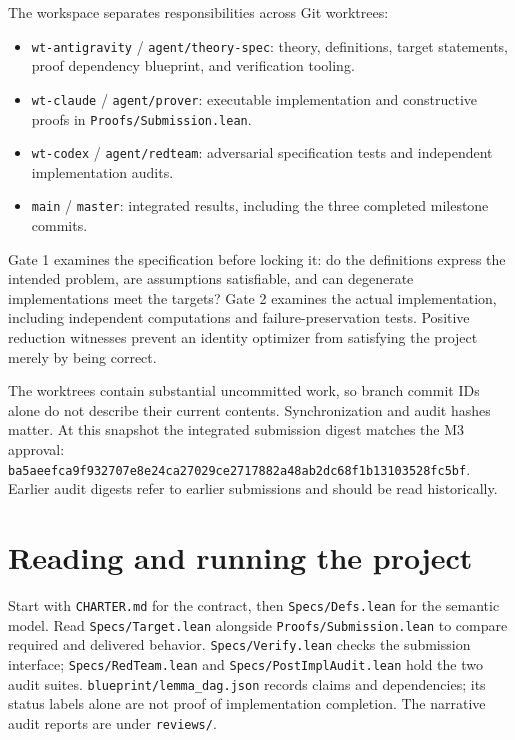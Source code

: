 \documentclass[11pt]{article}
\begin{document}
The workspace separates responsibilities across Git worktrees:

\begin{itemize}
\item \texttt{wt-antigravity} / \texttt{agent/theory-spec}: theory, definitions, target statements, proof dependency blueprint, and verification tooling.
\item \texttt{wt-claude} / \texttt{agent/prover}: executable implementation and constructive proofs in \texttt{Proofs/Submission.lean}.
\item \texttt{wt-codex} / \texttt{agent/redteam}: adversarial specification tests and independent implementation audits.
\item \texttt{main} / \texttt{master}: integrated results, including the three completed milestone commits.
\end{itemize}

Gate 1 examines the specification before locking it: do the definitions express the intended problem, are assumptions satisfiable, and can degenerate implementations meet the targets? Gate 2 examines the actual implementation, including independent computations and failure-preservation tests. Positive reduction witnesses prevent an identity optimizer from satisfying the project merely by being correct.

The worktrees contain substantial uncommitted work, so branch commit IDs alone do not describe their current contents. Synchronization and audit hashes matter. At this snapshot the integrated submission digest matches the M3 approval: \texttt{ba5aeefc\allowbreak{}a9f93270\allowbreak{}7e8e24ca\allowbreak{}27029ce2\allowbreak{}717882a4\allowbreak{}8ab2dc68\allowbreak{}f1b13103\allowbreak{}528fc5bf}. Earlier audit digests refer to earlier submissions and should be read historically.

\section*{Reading and running the project}

Start with \texttt{CHARTER.md} for the contract, then \texttt{Specs/Defs.lean} for the semantic model. Read \texttt{Specs/Target.lean} alongside \texttt{Proofs/Submission.lean} to compare required and delivered behavior. \texttt{Specs/Verify.lean} checks the submission interface; \texttt{Specs/RedTeam.lean} and \texttt{Specs/PostImplAudit.lean} hold the two audit suites. \texttt{blueprint/lemma\_dag.json} records claims and dependencies; its status labels alone are not proof of implementation completion. The narrative audit reports are under \texttt{reviews/}.
\end{document}
